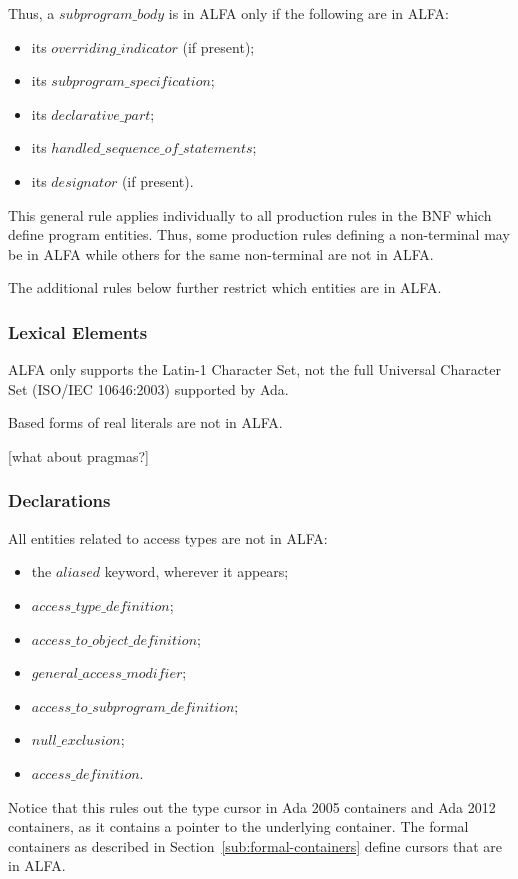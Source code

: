 \documentclass{article}
\newcommand{\bnf}[1]{$\mathit{#1}$}
\begin{document}
Thus, a \bnf{subprogram\_body} is in ALFA only if the following are in ALFA:
\begin{itemize}
\item its \bnf{overriding\_indicator} (if present);
\item its \bnf{subprogram\_specification};
\item its \bnf{declarative\_part};
\item its \bnf{handled\_sequence\_of\_statements};
\item its \bnf{designator} (if present).
\end{itemize}

This general rule applies individually to all production rules in the BNF
which define program entities. Thus, some production rules defining a
non-terminal may be in ALFA while others for the same non-terminal are not in
ALFA.

The additional rules below further restrict which entities are in ALFA. 

\subsubsection{Lexical Elements}

ALFA only supports the Latin-1 Character Set, not the full Universal Character
Set (ISO/IEC 10646:2003) supported by Ada.

Based forms of real literals are not in ALFA.

[what about pragmas?]

\subsubsection{Declarations}

All entities related to access types are not in ALFA:
\begin{itemize}
\item the \bnf{aliased} keyword, wherever it appears;
\item \bnf{access\_type\_definition};
\item \bnf{access\_to\_object\_definition};
\item \bnf{general\_access\_modifier};
\item \bnf{access\_to\_subprogram\_definition};
\item \bnf{null\_exclusion};
\item \bnf{access\_definition}.
\end{itemize}

Notice that this rules out the type cursor in Ada 2005 containers and Ada 2012
containers, as it contains a pointer to the underlying container. The formal
containers as described in Section~\ref{sub:formal-containers} define cursors
that are in ALFA.
\end{document}
